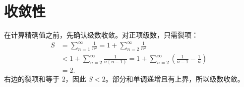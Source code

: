 \section{收敛性}

在计算精确值之前，先确认级数收敛。对正项级数，只需裂项：
\begin{equation}
\begin{aligned}
S&=\sum_{n=1}^{\infty}\frac{1}{n^2}
=1+\sum_{n=2}^{\infty}\frac{1}{n^2}\\
&<1+\sum_{n=2}^{\infty}\frac{1}{n(n-1)}
=1+\sum_{n=2}^{\infty}\left(\frac{1}{n-1}-\frac{1}{n}\right)\\
&=2.
\end{aligned}
\label{eq:convergence}
\end{equation}
右边的裂项和等于 $2$，因此 $S<2$。部分和单调递增且有上界，所以级数收敛。
